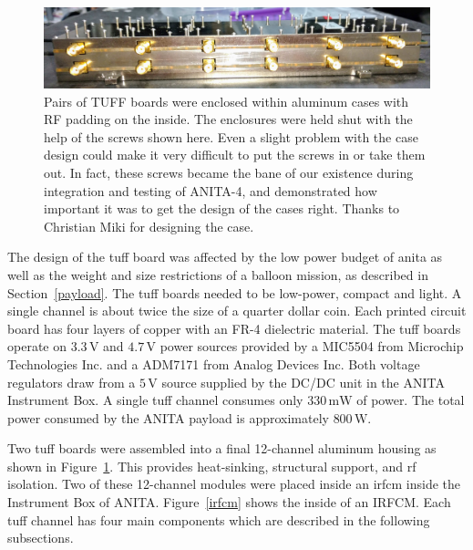 \begin{figure}
\centering
\includegraphics[width=1.0\textwidth]{figures/tuff_case_screws.jpg}
\caption{Pairs of TUFF boards were enclosed within aluminum cases with RF padding on the inside. The enclosures were held shut with the help of the screws shown here. Even a slight problem with the case design could make it very difficult to put the screws in or take them out. In fact, these screws became the bane of our existence during integration and testing of ANITA-4, and demonstrated how important it was to get the design of the cases right. Thanks to Christian Miki for designing the case.}
\label{case_screws}
\end{figure}

The design of the \gls{tuff} board was affected by the low power budget of \gls{anita} as well as the weight and size restrictions of a balloon mission, as described in Section~\ref{payload}. 
The \gls{tuff} boards needed to be low-power, compact and light. %
A single channel is about twice the size of a quarter dollar coin. 
Each printed circuit board has four layers of copper with an FR-4 dielectric material. 
The \gls{tuff} boards operate on $3.3\,\mathrm{V}$ and $4.7\,\mathrm{V}$ power sources 
provided by
a MIC5504 from Microchip Technologies Inc. and a ADM7171 from Analog Devices Inc. Both
voltage regulators draw from a $5\,\mathrm{V}$ source 
supplied by the DC/DC unit in the ANITA
Instrument Box. 
A single \gls{tuff} channel consumes only $330\,\mathrm{mW}$ of power. 
The total power consumed by the ANITA payload is approximately $800\,\mathrm{W}$. 

Two \gls{tuff} boards were assembled into a final 
12-channel aluminum housing as shown in Figure~\ref{case_screws}. This provides heat-sinking, structural support, and \gls{rf} isolation. 
Two of these 12-channel modules were placed inside an 
\gls{irfcm} inside the Instrument Box of ANITA. Figure~\ref{irfcm} shows the inside of an IRFCM. Each \gls{tuff} channel has four main components which are described in the following subsections. 

